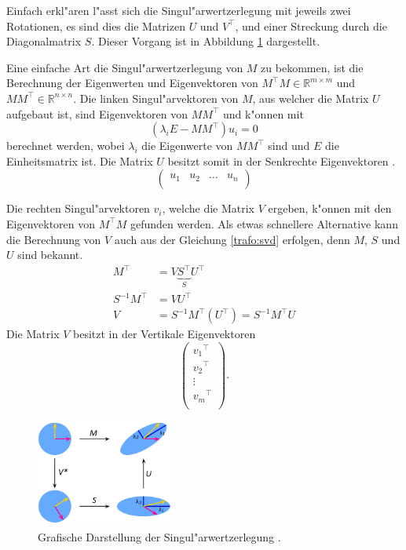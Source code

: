 \begin{refsection}
Einfach erkl"aren l"asst sich die Singul"arwertzerlegung mit jeweils zwei Rotationen, es sind dies die Matrizen $U$ und $V^\top$, und einer Streckung durch die Diagonalmatrix $S$. Dieser Vorgang ist in Abbildung \ref{trafo:SVDFig} dargestellt. 

Eine einfache Art die Singul"arwertzerlegung von $M$ zu bekommen, ist die Berechnung der Eigenwerten und Eigenvektoren von $M^\top M \in \mathbb{R}^{m \times m}$ und $MM^\top \in \mathbb{R}^{n \times n}$. Die linken Singul"arvektoren von $M$, aus welcher die Matrix $U$ aufgebaut ist, sind Eigenvektoren von $MM^\top$ und k"onnen mit
\begin{equation*}
	\left(\lambda_i E - MM^\top\right)u_i = 0
\end{equation*}
berechnet werden, wobei $\lambda_i$ die Eigenwerte von $MM^\top$ sind und $E$ die Einheitsmatrix ist. Die Matrix $U$ besitzt somit in der Senkrechte Eigenvektoren \cite{trafo:Watkins}.
\begin{equation*}
	\left( 
		\begin{array}{cccc}
		u_1 & u_2 & \dots & u_n  \\		
		\end{array}
	\right)
\end{equation*}

Die rechten Singul"arvektoren $v_i$, welche die Matrix $V$ ergeben, k"onnen mit den Eigenvektoren von $M^\top M$ gefunden werden. Als etwas schnellere Alternative kann die Berechnung von $V$ auch aus der Gleichung \ref{trafo:svd} erfolgen, denn $M$, $S$ und $U$ sind bekannt. 
\begin{align*}
	M^\top &= V \underbrace{S^\top}_{S} U^\top\\
	S^{-1} M^\top &= V U^\top\\
	V &= S^{-1} M^\top \left(U^\top\right) = S^{-1} M^\top U
\end{align*}
Die Matrix $V$ besitzt in der Vertikale Eigenvektoren  \cite{trafo:Watkins}
\begin{equation*}
	\left( 
		\begin{array}{c}
		{v_1}^{\top}\\
		{v_2}^{\top}\\
		\vdots\\
		{v_m}^{\top}\\			
		\end{array}
	\right).
\end{equation*}

\begin{figure}
	\centering
	\includegraphics[width=0.4\textwidth]{./trafo/images/svd.png}
	\caption{Grafische Darstellung der Singul"arwertzerlegung \cite{trafo:SVDWiki}.}
	\label{trafo:SVDFig}
\end{figure}


\end{refsection}
